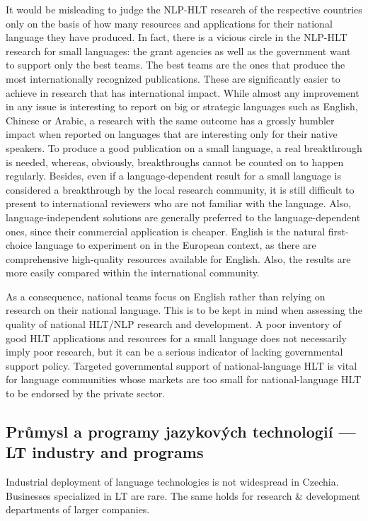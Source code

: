 \documentclass[]{../../metanetpaper}
\begin{document}
\begin{multicols}{2}
It would be misleading to judge the NLP-HLT research of the respective countries only on the basis of how many resources and applications for their national language they have produced. In fact, there is a vicious circle in the NLP-HLT research for small languages: the grant agencies as well as the government want to support only the best teams. The best teams are the ones that produce the most internationally recognized publications. These are significantly easier to achieve in research that has international impact. While almost any improvement in any issue is interesting to report on big or strategic languages such as English, Chinese or Arabic, a research with the same outcome has a grossly humbler impact when reported on languages that are interesting only for their native speakers. To produce a good publication on a small language, a real breakthrough is needed, whereas, obviously, breakthroughs cannot be counted on to happen regularly.  Besides, even if a language-dependent result for a small language is considered a breakthrough by the local research community, it is still difficult to present to international reviewers who are not familiar with the language.
Also, language-independent solutions are generally preferred to the language-dependent ones, since their commercial application is cheaper. English is the natural first-choice language to experiment on in the European context, as there are comprehensive high-quality resources available for English. Also, the results are more easily compared within the international community.

As a consequence, national teams focus on English rather than relying on research on their national language. This is to be kept in mind when assessing the quality of national HLT/NLP research and development. A poor inventory of good HLT applications and resources for a small language does not necessarily imply poor research, but it can be a serious indicator of lacking governmental support policy. Targeted governmental support of national-language HLT is vital for language communities whose markets are too small for national-language HLT to be endorsed by the private sector.
 
\subsection{Průmysl a programy jazykových technologií --- LT industry and programs}

Industrial deployment of language technologies is not widespread in Czechia. Businesses specialized in LT are rare. The same holds for research \& development departments of larger companies.


\end{multicols}
\end{document}
